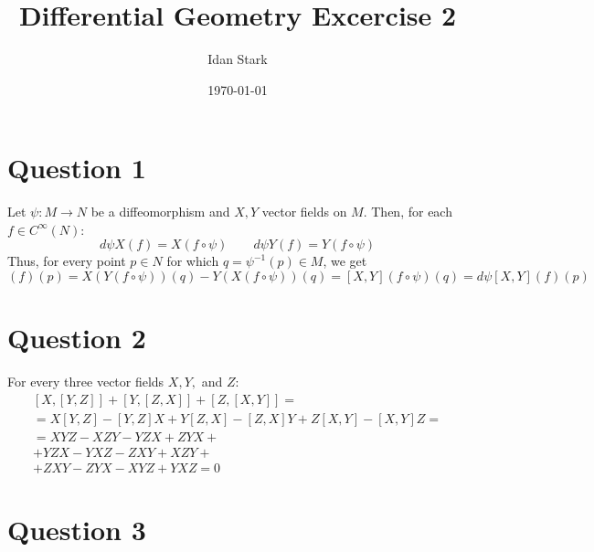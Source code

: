 \documentclass{article}
\title{Differential Geometry Excercise 2}
\author{Idan Stark}
\date{\today}
\begin{document}
\maketitle

\section*{Question 1}
Let $\psi: M \rightarrow N$ be a diffeomorphism and $X, Y$ vector fields on $M$. Then, for each $f \in C^\infty(N)$:
\begin{equation}
    d\psi X (f) = X (f \circ \psi) \qquad d\psi Y (f) = Y (f \circ \psi)
\end{equation}
Thus, for every point $p \in N$ for which $q = \psi^{-1}(p) \in M$, we get
\begin{equation}
    [d\psi X, d\psi Y](f)(p) = X (Y (f \circ \psi))(q) - Y (X (f \circ \psi))(q) = [X,Y](f \circ \psi)(q) = d\psi[X,Y](f)(p)
\end{equation}

\section*{Question 2}
For every three vector fields $X, Y,$ and $Z$:
\begin{equation}
\begin{gathered}
    \left[X,\left[Y,Z\right]\right] + \left[Y,\left[Z,X\right]\right] + \left[Z,\left[X,Y\right]\right] =
    \\
    = X\left[Y, Z\right] - \left[Y, Z\right]X + 
    Y\left[Z, X\right] - \left[Z, X\right]Y + 
    Z\left[X, Y\right] - \left[X, Y\right]Z =
    \\
    = XYZ - XZY - YZX + ZYX + \\
    + YZX - YXZ - ZXY + XZY + \\ 
    + ZXY - ZYX - XYZ + YXZ = 0
\end{gathered}
\end{equation}

\section*{Question 3}
\end{document}
